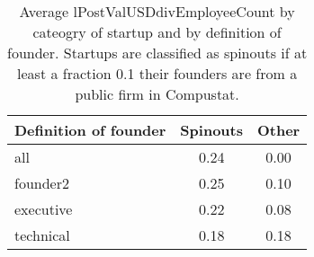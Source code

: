 \begin{table}[!htb]
\centering
\begingroup\small
\begin{tabular}{p{1.5cm}cc}
  \toprule
Definition of founder & Spinouts & Other \\ 
  \midrule
all & 0.24 & 0.00 \\ 
  founder2 & 0.25 & 0.10 \\ 
  executive & 0.22 & 0.08 \\ 
  technical & 0.18 & 0.18 \\ 
   \bottomrule
\end{tabular}
\endgroup
\caption{Average lPostValUSDdivEmployeeCount by cateogry of startup and by definition of founder. Startups are classified as spinouts if at least a fraction 0.1 their founders are from a public firm in Compustat.} 
\label{table:raw_comparison_lPostValUSDdivEmployeeCount}
\end{table}
